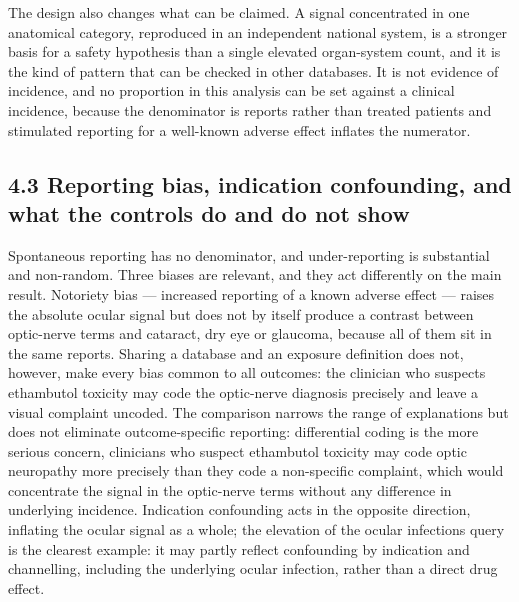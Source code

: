 \documentclass[12pt,a4paper]{article}
\begin{document}
The design also changes what can be claimed. A signal concentrated in one anatomical category, reproduced in an independent national system, is a stronger basis for a safety hypothesis than a single elevated organ-system count, and it is the kind of pattern that can be checked in other databases. It is not evidence of incidence, and no proportion in this analysis can be set against a clinical incidence, because the denominator is reports rather than treated patients and stimulated reporting for a well-known adverse effect inflates the numerator.

\subsection*{4.3 Reporting bias, indication confounding, and what the controls do and do not show}

Spontaneous reporting has no denominator, and under-reporting is substantial and non-random. Three biases are relevant, and they act differently on the main result. Notoriety bias — increased reporting of a known adverse effect — raises the absolute ocular signal but does not by itself produce a contrast between optic-nerve terms and cataract, dry eye or glaucoma, because all of them sit in the same reports. Sharing a database and an exposure definition does not, however, make every bias common to all outcomes: the clinician who suspects ethambutol toxicity may code the optic-nerve diagnosis precisely and leave a visual complaint uncoded. The comparison narrows the range of explanations but does not eliminate outcome-specific reporting: differential coding is the more serious concern, clinicians who suspect ethambutol toxicity may code optic neuropathy more precisely than they code a non-specific complaint, which would concentrate the signal in the optic-nerve terms without any difference in underlying incidence. Indication confounding acts in the opposite direction, inflating the ocular signal as a whole; the elevation of the ocular infections query is the clearest example: it may partly reflect confounding by indication and channelling, including the underlying ocular infection, rather than a direct drug effect.
\end{document}
